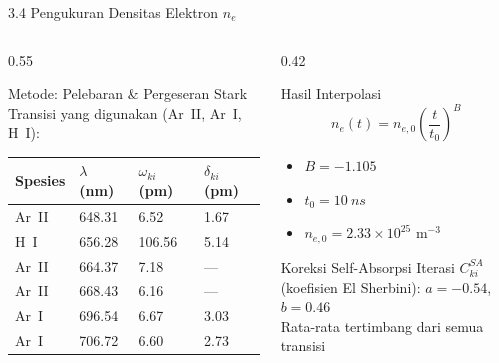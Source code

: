 \documentclass[aspectratio=169, 10pt]{beamer}
\begin{document}
\begin{frame}{3.4 Pengukuran Densitas Elektron $n_e$}
  \begin{columns}[T]
    \begin{column}{0.55\textwidth}
      \begin{block}{Metode: Pelebaran \& Pergeseran Stark}
        \small
        Transisi yang digunakan (Ar~II, Ar~I, H~I):
        \begin{tabular}{llll}
          \toprule
          Spesies & $\lambda$ (nm) & $\omega_{ki}$ (pm) & $\delta_{ki}$ (pm) \\
          \midrule
          Ar~II & 648.31 & 6.52 & 1.67 \\
          H~I   & 656.28 & 106.56 & 5.14 \\
          Ar~II & 664.37 & 7.18 & --- \\
          Ar~II & 668.43 & 6.16 & --- \\
          Ar~I  & 696.54 & 6.67 & 3.03 \\
          Ar~I  & 706.72 & 6.60 & 2.73 \\
          \bottomrule
        \end{tabular}
      \end{block}
    \end{column}
    \begin{column}{0.42\textwidth}
      \begin{block}{Hasil Interpolasi}
        \begin{equation}
          n_e(t) = n_{e,0}\left(\frac{t}{t_0}\right)^B
        \end{equation}
        \begin{itemize}\small
          \item $B = -1.105$
          \item $t_0 = \SI{10}{ns}$
          \item $n_{e,0} = 2.33\times10^{25}$ m$^{-3}$
        \end{itemize}
      \end{block}
      \begin{exampleblock}{Koreksi Self-Absorpsi}
        \small
        Iterasi $C_{ki}^{SA}$ (koefisien El Sherbini): $a=-0.54$, $b=0.46$\\
        Rata-rata tertimbang dari semua transisi
      \end{exampleblock}
    \end{column}
  \end{columns}
\end{frame}
\end{document}
